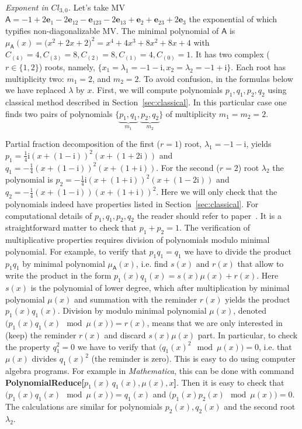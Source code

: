 \documentclass[AMA,STIX1COL]{WileyNJD-v2}
\def\m#1{\mathsf{#1}} %
\newcommand{\cl}[2]{\ensuremath{\mathit{Cl}_{#1,#2}}}
\newcommand{\ii}{\mathrm{i}}
\def\m#1{\mathsf{#1}}%
\def\e#1{\mathbf{e}_{#1}} %
\begin{document}
\begin{eexample}\label{exampleCl30}
  {\it Exponent in \cl{3}{0}.}  Let's take   MV
  $\m{A}=-1+2 \e{1}-2 \e{12}-\e{123}-2 \e{13}+\e{2}+\e{23}+2 \e{3}$ the exponential of  which typifies non-diagonalizable MV.
  The minimal polynomial of  $\m{A}$ is
  $\mu_{\m{A}}(x)=\bigl(x^2+2 x+2\bigr)^2=x^4+4 x^3+8 x^2+8 x+4$ with $C_{(4)}= 4,C_{(3)}= 8,C_{(2)}=
   8,C_{(1)}= 4,C_{(0)}= 1$. It has two complex ($r\in \{1,2\}$) roots, namely, $\{x_1=\lambda_1=-1-\ii,x_2=\lambda_2= -1+\ii\}$.
   Each root has multiplicity two: $m_1=2$, and $m_2=2$. To avoid confusion, in the formulas below we have replaced
   $\lambda$ by $x$.  First, we will compute polynomials $p_1,q_1,p_2,q_2$ using classical method described
   in Section~\ref{sec:classical}. In this particular case one finds two pairs of polynomials $\bigl\{
  \underbrace{p_1,q_1}_{m_1},  \underbrace{p_2,q_2}_{m_2} 
\bigr\}$ of multiplicity $m_1=m_2=2$.

Partial fraction decomposition of the first ($r=1$) root,
$\lambda_1=-1-\ii$, yields $p_1=\frac{1}{4} \ii (x+(1-\ii))^2
(x+(1+2 \ii))$ and $q_1=-\frac{1}{4} (x+(1-\ii))^2 (x+(1+\ii))$.
For the second ($r=2$) root $\lambda_2$ the polynomial is $p_2=-\frac{1}{4} \ii
(x+(1+\ii))^2 (x+(1-2 \ii))$ and $q_2=-\frac{1}{4} (x+(1-\ii))
(x+(1+\ii))^2$. Here we will only check that the polynomials indeed have
properties listed in Section~\ref{sec:classical}. For computational
details of $p_1,q_1,p_2,q_2$ the reader should refer to paper~\cite{Sobczyk1997}.  It is a straightforward
matter to check that $p_1+p_2=1$. The verification of multiplicative
properties requires division of polynomials modulo minimal polynomial. For example, to verify
that $p_1 q_1=q_1$ we have to divide the product $p_1 q_1$ by minimal polynomial
  $\mu_{\m{A}}(x)$, i.e. find $s(x)$ and $r(x)$ that allow to write the product in the form  $p_1(x) q_1(x)=
s(x)\mu(x) +r(x)$. Here $s(x)$ is the polynomial of lower degree, which after multiplication by minimal polynomial $\mu(x)$ and
summation with the reminder $r(x)$ yields the product $p_1(x)
q_1(x)$. Division by modulo minimal polynomial $\mu(x)$, denoted $\bigl( p_1(x) q_1(x)
  \mod \mu(x)\bigr)= r(x)$, means that we are
only interested in (keep) the reminder $r(x)$ and discard
  $s(x)\mu(x)$ part. In particular, to check the property $q_1^2=0$ we have to
  verify that $\bigl(q_1(x)^2 \mod \mu(x)\bigr) =0$, i.e.
  that $\mu(x)$ divides $q_1(x)^2$ (the reminder is zero). This is easy to do using computer algebra programs.
For example in {\it Mathematica}, this can be done with command {\bf
PolynomialReduce[}$p_1(x)\, q_1(x),\mu(x), x${\bf ]}. Then
  it is easy to check that $\bigl(p_1(x) q_1(x)\mod \mu(x)\bigr) =q_1(x)$
  and $\bigl(p_1(x) p_2(x)\mod \mu(x)\bigr) =0$. The calculations are similar for
polynomials $p_2(x), q_2(x)$ and the second root $\lambda_2$.


\end{eexample}
\end{document}
